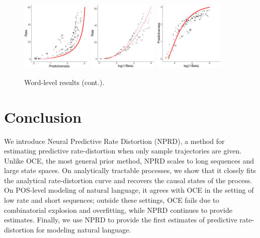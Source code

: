\documentclass[11pt,letterpaper]{article}
\begin{document}
\begin{figure}
\begin{center}
		\includegraphics[width=0.3\textwidth]{code/figures/LDC2012T05-words-info-fitted.pdf}
\includegraphics[width=0.3\textwidth]{code/figures/LDC2012T05-words-nlogbeta-mem-fitted.pdf}
\includegraphics[width=0.3\textwidth]{code/figures/LDC2012T05-words-nlogbeta-ee-fitted.pdf}
	\end{center}
	\caption{Word-level results (cont.).}\label{fig:LDC2012T05-logbeta-fit}
\end{figure}






\section{Conclusion}
We introduce Neural Predictive Rate Distortion (NPRD), a method for estimating predictive rate-distortion when only sample trajectories are given.
Unlike OCE, the most general prior method, NPRD scales to long sequences and large state spaces.
On analytically tractable processes, we show that it closely fits the analytical rate-distortion curve and recovers the causal states of the process.
On POS-level modeling of natural language, it agrees with OCE in the setting of low rate and short sequences; outside these settings, OCE fails due to combinatorial explosion and overfitting, while NPRD continues to provide estimates.
Finally, we use NPRD to provide the first estimates of predictive rate-distortion for modeling natural language.



%

\end{document}
